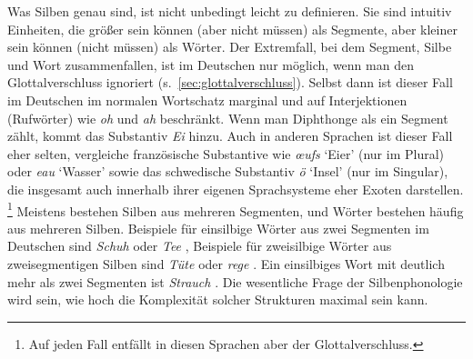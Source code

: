 Was Silben genau sind, ist nicht unbedingt leicht zu definieren.
Sie sind intuitiv Einheiten, die größer sein können (aber nicht müssen) als Segmente, aber kleiner sein können (nicht müssen) als Wörter.
Der Extremfall, bei dem Segment, Silbe und Wort zusammenfallen, ist im Deutschen nur möglich, wenn man den Glottalverschluss ignoriert (s.~\ref{sec:glottalverschluss}).
Selbst dann ist dieser Fall im Deutschen im normalen Wortschatz marginal und auf Interjektionen (Rufwörter) wie \textit{oh} \textipa{[Po:]} und \textit{ah} \textipa{[Pa:]} beschränkt.
Wenn man Diphthonge als ein Segment zählt, kommt das Substantiv \textit{Ei} \textipa{[P\t{aE}]} hinzu.
Auch in anderen Sprachen ist dieser Fall eher selten, vergleiche französische Substantive wie \textit{œufs} \textipa{[\o:]} `Eier' (nur im Plural) oder \textit{eau} \textipa{[o:]} `Wasser' sowie das schwedische Substantiv \textit{ö} \textipa{[\o:]} `Insel' (nur im Singular), die insgesamt auch innerhalb ihrer eigenen Sprachsysteme eher Exoten darstellen.%
\footnote{Auf jeden Fall entfällt in diesen Sprachen aber der Glottalverschluss.} 
Meistens bestehen Silben aus mehreren Segmenten, und Wörter bestehen häufig aus mehreren Silben.
Beispiele für einsilbige Wörter aus zwei Segmenten im Deutschen sind \textit{Schuh} \textipa{[Su:]} oder \textit{Tee} \textipa{[te:]}, Beispiele für zweisilbige Wörter aus zweisegmentigen Silben sind \textit{Tüte} \textipa{[ty:t@]} oder \textit{rege} \textipa{[Ke:g@]}.
Ein einsilbiges Wort mit deutlich mehr als zwei Segmenten ist \textit{Strauch} \textipa{[StK\t{aO}X]}. 
Die wesentliche Frage der Silbenphonologie wird sein, wie hoch die Komplexität solcher Strukturen maximal sein kann.


